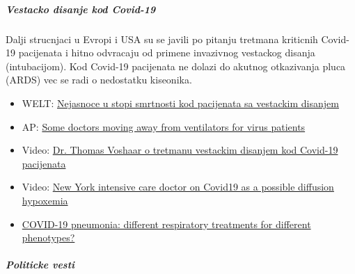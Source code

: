 \hypertarget{vestacko-disanje-kod-covid-19}{%
\subparagraph{\texorpdfstring{\textbf{Vestacko disanje kod
Covid-19}}{Vestacko disanje kod Covid-19}}\label{vestacko-disanje-kod-covid-19}}

Dalji strucnjaci u Evropi i USA su se javili po pitanju tretmana
kriticnih Covid-19 pacijenata i hitno odvracaju od primene invazivnog
vestackog disanja (intubacijom). Kod Covid-19 pacijenata ne dolazi do
akutnog otkazivanja pluca (ARDS) vec se radi o nedostatku kiseonika.

\begin{itemize}
\tightlist
\item
  WELT:
  \href{https://www.welt.de/vermischtes/article207221877/Corona-Pandemie-Sterberate-bei-Beatmungspatienten-gibt-Raetsel-auf.html}{Nejasnoce
  u stopi smrtnosti kod pacijenata sa vestackim disanjem}
\item
  AP: \href{https://apnews.com/8ccd325c2be9bf454c2128dcb7bd616d}{Some
  doctors moving away from ventilators for virus patients}
\item
  Video: \href{https://www.youtube.com/watch?v=QPlEUAVjxV8}{Dr. Thomas
  Voshaar o tretmanu vestackim disanjem kod Covid-19 pacijenata}
\item
  Video: \href{https://www.youtube.com/watch?v=NmRlvX3VrAQ}{New York
  intensive care doctor on Covid19 as a possible diffusion hypoxemia}
\item
  \href{https://link.springer.com/article/10.1007/s00134-020-06033-2}{COVID-19
  pneumonia: different respiratory treatments for different phenotypes?}
\end{itemize}

\hypertarget{politicke-vesti-2}{%
\subparagraph{\texorpdfstring{\textbf{Politicke
vesti}}{Politicke vesti}}\label{politicke-vesti-2}}

